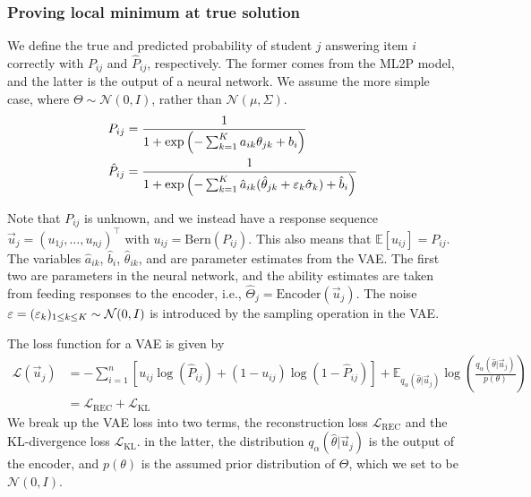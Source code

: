 \subsubsection{Proving local minimum at true solution}

We define the true and predicted probability of student $j$ answering item $i$ correctly with $P_{ij}$ and $\hat P_{ij}$, respectively. The former comes from the ML2P model, and the latter is the output of a neural network. We assume the more simple case, where $\Theta \sim \mathcal{N}(0,I)$, rather than $\mathcal{N}(\mu, \Sigma)$.
\begin{equation}
  \begin{split}
  P_{ij} &= \frac{1}{1 + \exp\left(-\sum_{k=1}^K a_{ik}\theta_{jk} + b_i\right)}\\
  \label{eq:ml2p_est}
  \hat P_{ij} &= \frac{1}{1 + \exp\left(-\sum_{k=1}^K \hat a_{ik} (\hat \theta_{jk} + \varepsilon_k \hat \sigma_k) + \hat b_i\right)} 
\end{split}
    \label{eq:vae_out}
\end{equation}

Note that $P_{ij}$ is unknown, and we instead have a response sequence $\vec u_j = (u_{1j},\ldots, u_{nj})^\top$ with $u_{ij} = \text{Bern}(P_{ij})$. This also means that $\mathbb{E}[u_{ij}] = P_{ij}$. The variables $\hat a_{ik}$, $\hat b_i$, $\hat \theta_{ik}$, and are parameter estimates from the VAE. The first two are parameters in the neural network, and the ability estimates are taken from feeding responses to the encoder, i.e., $\hat \Theta_j = \text{Encoder}(\vec u_j)$. The noise $\varepsilon = (\varepsilon_k)_{1\leq k \leq K} \sim \mathcal{N}(0,I)$ is introduced by the sampling operation in the VAE.


The loss function for a VAE is given by 
\begin{equation}
  \begin{split}
  \mathcal{L}(\vec u_j) &= -\sum_{i=1}^n \left[u_{ij} \log(\hat P_{ij}) + (1-u_{ij})\log(1 - \hat P_{ij})\right] + \mathbb{E}_{q_\alpha(\hat \theta | \vec u_j)}\log\left( \frac{q_{\alpha}(\hat \theta |\vec u_j)}{p(\theta)}\right) \\
    &= \mathcal{L}_{\text{REC}} + \mathcal{L}_{\text{KL}}
  \end{split}
  \label{eq:vae_loss}
\end{equation}
We break up the VAE loss into two terms, the reconstruction loss $\mathcal{L}_{\text{REC}}$ and the KL-divergence loss $\mathcal{L}_{\text{KL}}$. in the latter, the distribution $q_\alpha(\hat \theta | \vec u_j)$ is the output of the encoder, and $p(\theta)$ is the assumed prior distribution of $\Theta$, which we set to be $\mathcal{N}(0,I)$.

